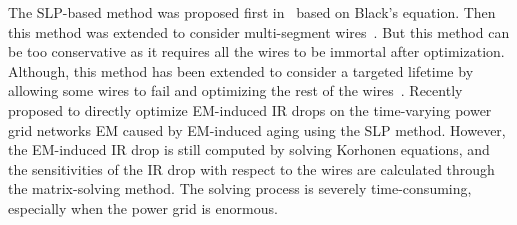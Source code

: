 The SLP-based method was proposed first in~\cite{Tan:DAC'99} based on Black's equation. Then this method was extended to consider multi-segment wires~\cite{ZhouSun:ASPDAC'18}. But this method can be too conservative as it requires all the wires to be immortal after optimization. Although, this method has been extended to consider a targeted lifetime by allowing some wires to fail and optimizing the rest of the wires~\cite{ZhouSun:TVLSI'19}.  Recently~\cite{Sukharev:2019pg} proposed to directly optimize EM-induced IR drops on the time-varying power grid networks EM caused by EM-induced aging using the SLP method. However, the EM-induced IR drop is still computed by solving Korhonen equations, and the sensitivities of the IR drop with respect to the wires are calculated through the matrix-solving method.  
The solving process is severely time-consuming, especially when the power grid is enormous.











